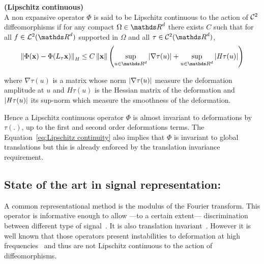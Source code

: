 \documentclass[a4paper,11pt]{report}
\begin{document}
			\begin{defn} \textbf{(Lipschitz continuous)}\\
				A non expansive operator $\Phi$ is said to be Lipschitz continuous to the action of $\mathcal{C}^{2}$ diffeomorphisms if for any compact $\Omega \in \dsR^{d}$ there exists $C$ such that for all $f \in \mcalL^{2}(\dsR^{d})$ supported in $\Omega$ and all $\tau \in \mcalC^{2}(\dsR^{d})$,
				\begin{equation}
					\norm{\Phi(\bfx) - \Phi(L_{\tau}\bfx)}_{\mathit{H}} \leq 
					C \norm{\bfx} \left(\sup_{u \in \dsR^{d}} \abs{\nabla \tau(u)} + \sup_{u \in \dsR^{d}} \abs{\mathit{H}\tau(u)}\right)
					\label{eq:Lipschitz continuity}
				\end{equation}
				\label{pty:Lipschitz continuity - intuition}
							
				where $\nabla \tau(u)$ is a matrix whose norm $\left| \nabla \tau(u) \right|$ measure the deformation amplitude at $u$ and  $\mathit{H}\tau(u)$ is the Hessian matrix of the deformation and $\left| \mathit{H}\tau(u) \right|$ its sup-norm which measure the smoothness of the deformation.\\
      \end{defn}

      Hence a Lipschitz continuous operator $\Phi$ is almost invariant to deformations by $\tau(.)$, up to the first and second order deformations terms. The Equation~\ref{eq:Lipschitz continuity} also implies that $\Phi$ is invariant to global translations but this is already enforced by the translation invariance requirement.\\ 
      

    \subsection{State of the art in signal representation:}
      \label{sec:Intro/Signal rep/State of the art}      
          
			A common representational method is the modulus of the Fourier transform. This operator is informative enough to allow ---to a certain extent--- discrimination between different type of signal~\citep{baker2014using}. It is also translation invariant~\citep{bracewell1965fourier}. However it is well known that those operators present instabilities to deformation at high frequencies~\citep{hormander1971fourier} and thus are not Lipschitz continuous to the action of diffeomorphisms.
      
\end{document}
